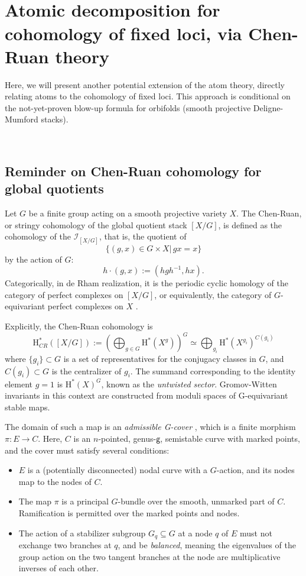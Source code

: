 \documentclass[12pt,a4paper]{amsart}
\theoremstyle{definition}
\theoremstyle{remark}
\newcommand{\rH}{\mathrm{H}}
\begin{document}
\ 

\ 

\section{Atomic decomposition for cohomology of fixed loci, via Chen-Ruan theory}
\label{sec:CR}


Here, we will present another potential extension of the atom theory, directly relating atoms to the cohomology of fixed loci. This approach is conditional on the not-yet-proven blow-up formula for orbifolds (smooth projective  Deligne-Mumford stacks).

\ 

\subsection{Reminder on Chen-Ruan cohomology for global quotients}

Let $G$ be a finite group acting on a smooth projective variety $X$. The Chen-Ruan, or stringy cohomology of the global quotient stack $[X/G]$, is defined as the cohomology of the  $\mathcal I_{[X/G]}$, that is, the quotient of 
$$\{(g,x)\in G\times X| \,gx=x\}    $$
by the action of $G$:
$$h\cdot (g,x):=(hgh^{-1},hx).$$
Categorically, in de Rham realization, it is the periodic cyclic homology of the category of perfect complexes on $[X/G]$, or equivalently, the category of $G$-equivariant perfect complexes on $X$ \cite{baranovsky2003orbifold, lupercio2004inertia}.

Explicitly, the Chen-Ruan cohomology is
\begin{equation}\mathrm{H}^\ast_{CR}([X/G]):=\left(\bigoplus_{g\in G}\rH^\ast(X^g)\right)^G\simeq \bigoplus_{g_i}\rH^\ast(X^{g_i})^{C(g_i)}\label{formulaCR}\end{equation}
where $\{g_i\}\subset G$ is a set of representatives for the conjugacy classes in $G$, and $C(g_i)\subset G$ is the centralizer of $g_i$. The summand corresponding to the identity element $g=1$ is $\rH^\ast(X)^G$, known as the \textit{untwisted sector}. Gromov-Witten invariants in this context are constructed from moduli spaces of G-equivariant stable maps.

The domain of such a map is an \emph{admissible G-cover} \cite[Def 2.1]{Jarvis2005}, which is a finite morphism $\pi: E \to C$. Here, $C$ is an $n$-pointed, genus-$\mathsf{g}$, semistable curve with marked points, and the cover must satisfy several conditions:
\begin{itemize}
    \item $E$ is a (potentially disconnected) nodal curve with a $G$-action, and its nodes map to the nodes of $C$.
    \item The map $\pi$ is a principal $G$-bundle over the smooth, unmarked part of $C$. Ramification is permitted over the marked points and nodes.
    \item The action of a stabilizer subgroup $G_q \subseteq G$ at a node $q$ of $E$ must not exchange two branches at $q$, and be \emph{balanced}, meaning the eigenvalues of the group action on the two tangent branches at the node are multiplicative inverses of each other.
\end{itemize}
\end{document}
